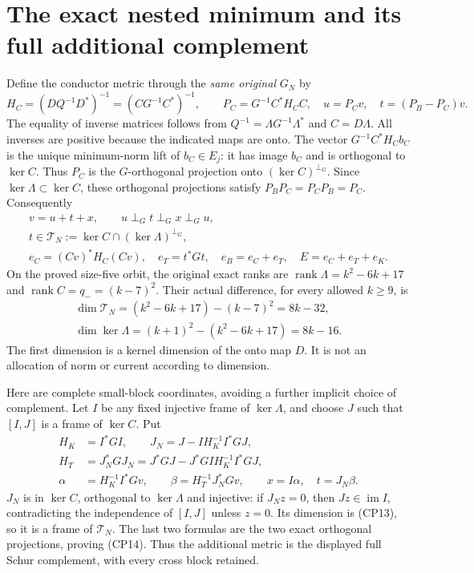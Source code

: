 \documentclass[11pt]{article}
\newcommand{\rank}{\operatorname{rank}}\newcommand{\Rea}{\operatorname{Re}}
\begin{document}
\section{The exact nested minimum and its full additional complement}
Define the conductor metric through the \emph{same original} $G_N$ by
\begin{equation}\tag{CP11}
 H_C=(D Q^{-1}D^*)^{-1}=(C G^{-1}C^*)^{-1},\qquad
 P_C=G^{-1}C^*H_CC,\quad u=P_Cv,\quad t=(P_B-P_C)v.
\end{equation}
The equality of inverse matrices follows from
$Q^{-1}=\Lambda G^{-1}\Lambda^*$ and $C=D\Lambda$.
All inverses are positive because the indicated maps are onto.
The vector $G^{-1}C^*H_Cb_C$ is the unique minimum-norm lift of
$b_C\in E_j$: it has image $b_C$ and is orthogonal to $\ker C$.
Thus $P_C$ is the $G$-orthogonal projection onto $(\ker C)^{\perp_G}$.
Since $\ker\Lambda\subset\ker C$, these orthogonal projections satisfy
$P_BP_C=P_CP_B=P_C$. Consequently
\begin{equation}\tag{CP12}
 \begin{gathered}
 v=u+t+x,\qquad u\perp_G t\perp_G x\perp_G u,\\
 t\in\mathcal T_N:=\ker C\cap(\ker\Lambda)^{\perp_G},\\
 e_C=(Cv)^*H_C(Cv),\quad e_T=t^*Gt,\quad
 e_B=e_C+e_T,\quad E=e_C+e_T+e_K.
 \end{gathered}
\end{equation}
On the proved size-five orbit, the original exact ranks are
$\rank\Lambda=k^2-6k+17$ and $\rank C=q_-=(k-7)^2$.
Their actual difference, for every allowed $k\ge9$, is
\begin{equation}\tag{CP13}
 \boxed{\begin{gathered}\dim\mathcal T_N=(k^2-6k+17)-(k-7)^2=8k-32,\\
 \dim\ker\Lambda=(k+1)^2-(k^2-6k+17)=8k-16.\end{gathered}}
\end{equation}
The first dimension is a kernel dimension of the onto map $D$.
It is not an allocation of norm or current according to dimension.

Here are complete small-block coordinates, avoiding a further implicit
choice of complement. Let $I$ be any fixed injective frame of
$\ker\Lambda$, and choose $J$ such that $[I,J]$ is a frame of $\ker C$.
Put
\begin{equation}\tag{CP14}
 \begin{split}
 H_K&=I^*GI,\qquad
 J_N=J-IH_K^{-1}I^*GJ,\\
 H_T&=J_N^*GJ_N=J^*GJ-J^*GIH_K^{-1}I^*GJ,\\
 \alpha&=H_K^{-1}I^*Gv,\qquad
 \beta=H_T^{-1}J_N^*Gv,\qquad x=I\alpha,\quad t=J_N\beta.
 \end{split}
\end{equation}
$J_N$ is in $\ker C$, orthogonal to $\ker\Lambda$ and injective:
if $J_Nz=0$, then $Jz\in\operatorname{im}I$, contradicting the
independence of $[I,J]$ unless $z=0$. Its dimension is (CP13), so it
is a frame of $\mathcal T_N$. The last two formulas are the two exact
orthogonal projections, proving (CP14). Thus the additional metric is
the displayed full Schur complement, with every cross block retained.
\end{document}
